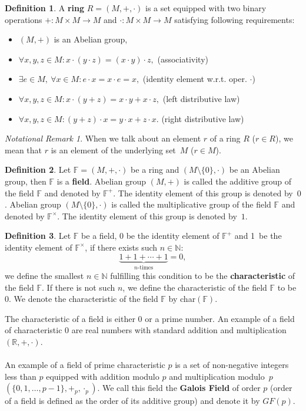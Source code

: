 \documentclass[thesis=M,english]{FITthesis}[2012/10/20]
\theoremstyle{remark}
\newtheorem*{NRM}{Notational Remark}
\theoremstyle{definition}
\newtheorem{DF}{Definition}[section]
\begin{document}
\begin{DF}
A \textbf{ring} $R = (M, +, \cdot)$  is a set equipped with two binary operations $+: M\times M \to M$ and $\cdot:  M\times M \to M$ satisfying following requirements:
\begin{itemize}
\item $(M, +)$ is an Abelian group, 
\item $\forall x,y,z \in M: x\cdot(y\cdot z) = (x \cdot y) \cdot z, $ \hfill (associativity)
\item $\exists e \in M,\ \forall x \in M: e \cdot x = x \cdot e = x,$ \hfill (identity element w.r.t. oper. $\cdot$)
\item $\forall x,y,z \in M:x \cdot(y+z)= x\cdot y + x \cdot z,$ \hfill (left distributive law) 
\item $\forall x,y, z \in M:(y + z) \cdot x = y\cdot x + z \cdot x.$ \hfill(right distributive law)
\end{itemize}
\end{DF}
\begin{NRM}
When we talk about an element $r$ of a ring $R$ ($r \in R$), we mean that $r$ is an element of the underlying set~$M$ ($r \in M$).
\end{NRM}
\begin{DF}
Let $\mathbb{F} = (M,+,\cdot)$ be a ring and $(M \setminus \{0\}, \cdot)$ be an Abelian group, then $\mathbb{F}$ is a \textbf{field}. Abelian group $(M, +)$ is  called the additive group of the field $\mathbb{F}$ and denoted by $\mathbb{F}^+$. The identity element of this group is denoted by~$0$. Abelian group $(M \setminus \{0\}, \cdot)$ is called the multiplicative group of the field $\mathbb{F}$ and denoted by $\mathbb{F}^\times$. The identity element of this group is denoted by~$1$.
\end{DF}
\begin{DF}
Let $\mathbb{F}$ be a field, 0 be the identity element of $\mathbb{F}^+$ and 1~be the identity element of $\mathbb{F}^\times$, if there exists such $n \in \mathbb{N}:$
$$
 \underbrace{1 + 1 + \cdots + 1}_\text{$n$-times} = 0,
$$ we define the smallest $n \in \mathbb{N}$ fulfilling this condition to be the \textbf{characteristic} of the field $\mathbb{F}.$ If there is not such $n$, we define the characteristic of the field $\mathbb{F}$ to be $0$. We denote the characteristic of the field $\mathbb{F}$ by char$(\mathbb{F})$.
\end{DF}
\noindent The characteristic of a field is either $0$ or a prime number. An example of a field of characteristic $0$ are real numbers with standard addition and multiplication $(\mathbb{R}, +, \cdot)$. \\ \\
An example of a field of prime characteristic $p$ is a set of non-negative integers less than $p$ equipped with addition modulo $p$ and multiplication modulo~$p$ $(\{0, 1, \ldots, p-1\}, +_p, \cdot_p)$. We call this field the \textbf{Galois Field} of order $p$ (order of a field is defined as the order of its additive group) and denote it by $GF(p)$.
\end{document}
